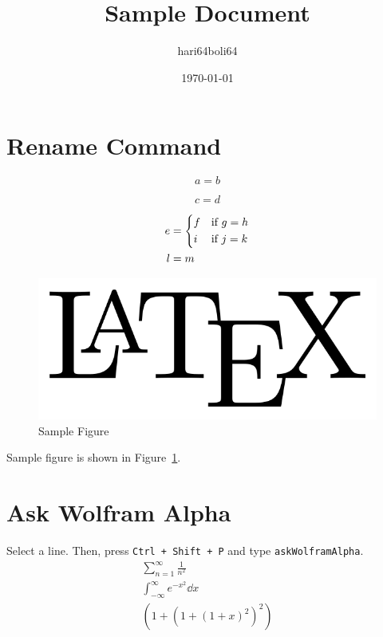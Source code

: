 \documentclass[a4paper, 10pt]{article}
\begin{document}
\title{Sample Document}
\author{hari64boli64}
\date{\today}
\maketitle

\section{Rename Command}

\begin{equation}\label{eq:1}
    a = b
\end{equation}

\begin{equation*}
    c = d
\end{equation*}

\begin{align}
    e & = \begin{dcases}
              f & \text{if } g = h \\
              i & \text{if } j = k
          \end{dcases} \\
    l & = m \notag
\end{align}

\begin{figure}[h] %
    \centering
    \includegraphics[width=0.5\columnwidth]{../images/sample.png}
    \caption{Sample Figure}
    \label{fig:1}
\end{figure}

Sample figure is shown in Figure~\ref{fig:1}.

\section{Ask Wolfram Alpha}

Select a line. Then, press \texttt{Ctrl + Shift + P} and type \texttt{askWolframAlpha}.
\begin{gather*}
    \sum_{n=1}^{\infty} \frac{1}{n^2} \\
    \int_{-\infty}^{\infty} e^{-x^2} \dd x \\
    \left(1+\left(1+\left(1+x\right)^2\right)^2\right)
\end{gather*}
\end{document}
